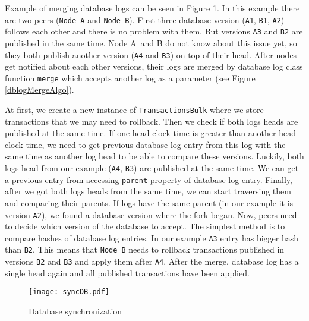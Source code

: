 Example of merging database logs can be seen in Figure \ref{syncDB}. In this example there are two peers (\texttt{Node A} and \texttt{Node B}). First three database version (\texttt{A1}, \texttt{B1}, \texttt{A2}) follows each other and there is no problem with them. But versions \texttt{A3} and \texttt{B2} are published in the same time. Node A~and B do not know about this issue yet, so they both publish another version (\texttt{A4} and \texttt{B3}) on top of their head. After nodes get notified about each other versions, their logs are merged by database log class function \texttt{merge} which accepts another log as a parameter (see Figure \ref{dblogMergeAlgo}). 

At first, we create a new instance of \texttt{TransactionsBulk} where we store transactions that we may need to rollback. Then we check if both logs heads are published at the same time. If one head clock time is greater than another head clock time, we need to get previous database log entry from this log with the same time as another log head to be able to compare these versions. Luckily, both logs head from our example (\texttt{A4}, \texttt{B3}) are published at the same time. We can get a previous entry from accessing \texttt{parent} property of database log entry. Finally, after we got both logs heads from the same time, we can start traversing them and comparing their parents. If logs have the same parent (in our example it is version \texttt{A2}), we found a database version where the fork began. Now, peers need to decide which version of the database to accept. The simplest method is to compare hashes of database log entries. In our example \texttt{A3} entry has bigger hash than \texttt{B2}. This means that \texttt{Node B} needs to rollback transactions published in versions \texttt{B2} and \texttt{B3} and apply them after \texttt{A4}. After the merge, database log has a single head again and all published transactions have been applied.

\begin{figure}[h]
    \centering
    \texttt{[image: syncDB.pdf]}
    \caption{Database synchronization}
    \label{syncDB}
\end{figure}

